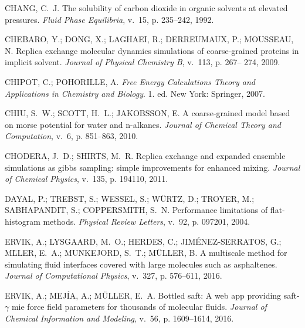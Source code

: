 \documentclass[
	12pt,				%
	openany,			%
	oneside,			%
	a4paper,			%
	english,			%
	brazil				%
	]{abntex2}
\begin{document}
\begin{thebibliography}{}
{CHANG, C.~J. The solubility of carbon dioxide in organic solvents at elevated
  pressures.
\emph{{F}luid {P}hase {E}quilibria}, v.~15, p. 235--242, 1992.}

{CHEBARO, Y.; DONG, X.; LAGHAEI, R.; DERREUMAUX, P.; MOUSSEAU, N. Replica
  exchange molecular dynamics simulations of coarse-grained proteins in
  implicit solvent.
\emph{Journal of Physical Chemistry B}, v.~113, p. 267– 274, 2009.}

{CHIPOT, C.; POHORILLE, A. \emph{Free Energy Calculations Theory and
  Applications in Chemistry and Biology}. 1. ed. New York: Springer, 2007.}

{CHIU, S.~W.; SCOTT, H.~L.; JAKOBSSON, E. A coarse-grained model based on morse
  potential for water and n-alkanes.
\emph{Journal of Chemical Theory and Computation}, v.~6, p. 851--863, 2010.}

{CHODERA, J.~D.; SHIRTS, M.~R. Replica exchange and expanded ensemble
  simulations as gibbs sampling: simple improvements for enhanced mixing.
\emph{Journal of Chemical Physics}, v.~135, p. 194110, 2011.}

{DAYAL, P.; TREBST, S.; WESSEL, S.; W\"URTZ, D.; TROYER, M.; SABHAPANDIT, S.;
  COPPERSMITH, S.~N. Performance limitations of flat-histogram methods.
\emph{Physical Review Letters}, v.~92, p. 097201, 2004.}

{ERVIK, A.; LYSGAARD, M.~O.; HERDES, C.; JIM\'ENEZ-SERRATOS, G.; M\"LLER,
  E.~A.; MUNKEJORD, S.~T.; M\"ULLER, B. A multiscale method for simulating
  fluid interfaces covered with large molecules such as asphaltenes.
\emph{Journal of Computational Physics}, v.~327, p. 576--611, 2016.}

{ERVIK, A.; MEJ\'IA, A.; M\"ULLER, E.~A. Bottled saft: A web app providing
  saft-$\gamma$ mie force field parameters for thousands of molecular fluids.
\emph{Journal of Chemical Information and Modeling}, v.~56, p. 1609–1614,
  2016.}


\end{thebibliography}
\end{document}
